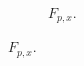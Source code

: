 \documentclass[dvipsnames, 10pt]{beamer}
\begin{document}
\begin{frame}
\begin{figure}[t]
\begin{subfigure}{0.53\textwidth}
            \caption{$F_{p, x}$.}
        \end{subfigure}
        \hspace*{-19mm}%
    \end{figure}
\end{frame}
\end{document}
